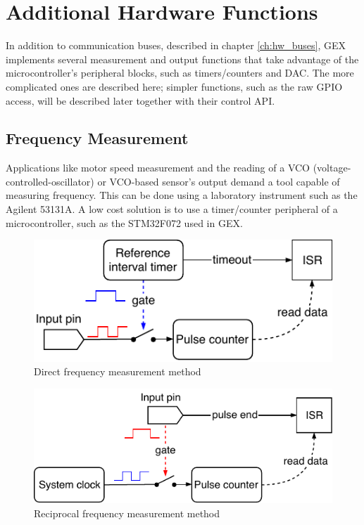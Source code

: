 \chapter{Additional Hardware Functions}

In addition to communication buses, described in chapter \ref{ch:hw_buses}, GEX implements several measurement and output functions that take advantage of the microcontroller's peripheral blocks, such as timers/counters and DAC. The more complicated ones are described here; simpler functions, such as the raw GPIO access, will be described later together with their control API.

\section{Frequency Measurement} \label{sec:theory-fcap}

Applications like motor speed measurement and the reading of a VCO (voltage-controlled-oscillator) or VCO-based sensor's output demand a tool capable of measuring frequency. This can be done using a laboratory instrument such as the Agilent 53131A. A low cost solution is to use a timer/counter peripheral of a microcontroller, such as the STM32F072 used in GEX.

\begin{figure}
	\centering
	\includegraphics[scale=1] {img/fcap-direct.pdf}
	\caption{\label{fig:fcap-direct-dia}Direct frequency measurement method}
\end{figure}

\begin{figure}
	\centering
	\includegraphics[scale=1] {img/fcap-reciprocal.pdf}
	\caption{\label{fig:fcap-reci-dia}Reciprocal frequency measurement method}
\end{figure}

